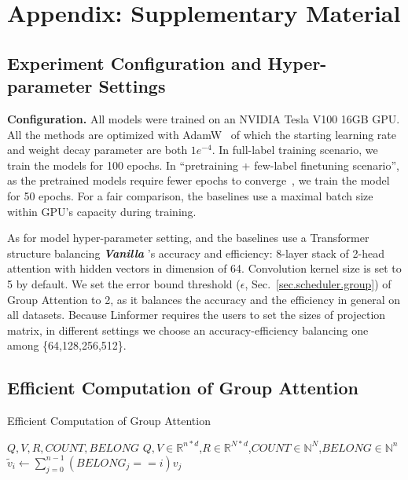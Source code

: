 
\begin{sloppypar}
\section{Appendix: Supplementary Material}
\subsection{Experiment Configuration and Hyper-parameter Settings}
\label{appendix.exp}
\noindent\textbf{Configuration.} All models were trained on an NVIDIA Tesla V100 16GB GPU. All the methods are optimized with AdamW~\cite{loshchilov2017decoupled} of which the starting learning rate and weight decay parameter are both $1e^{-4}$. In full-label training scenario, we train the models for 100 epochs. In ``pretraining + few-label finetuning scenario'', as the pretrained models require fewer epochs to converge~\cite{DBLP:conf/kdd/ZerveasJPBE21}, we train the model for 50 epochs. For a fair comparison, the baselines use a maximal batch size within GPU's capacity during training.

As for model hyper-parameter setting, \system and the baselines use a Transformer structure balancing \textit{\textbf{Vanilla}} 's accuracy and efficiency: 8-layer stack of 2-head attention with hidden vectors in dimension of 64. Convolution kernel size is set to 5 by default.
We set the error bound threshold ($\epsilon$, Sec.~\ref{sec.scheduler.group}) of Group Attention to 2, as it balances the accuracy and the efficiency in general on all datasets.
Because Linformer requires the users to set the sizes of projection matrix, in different settings we choose an accuracy-efficiency balancing one among \{64,128,256,512\}.

\subsection{Efficient Computation of Group Attention}
\label{appendix.groupAttention}
\begin{algorithm}
    \caption{Efficient Computation of Group Attention}
    \label{algo.grpattn}
    \small
    \begin{algorithmic}[1] 
    \Require $Q,V,R,COUNT,BELONG$
    \Ensure $Q,V \in \mathbb{R}^{n*d}$,$ R \in \mathbb{R}^{N*d}$,$COUNT \in \mathbb{N}^{N}$,$BELONG \in \mathbb{N}^{n}$
                    \State $\widetilde{v}_i \gets \sum_{j=0}^{n-1}(BELONG_j==i) v_j$
                \EndFor
                

\end{algorithmic}
\end{algorithm}
\end{sloppypar}
